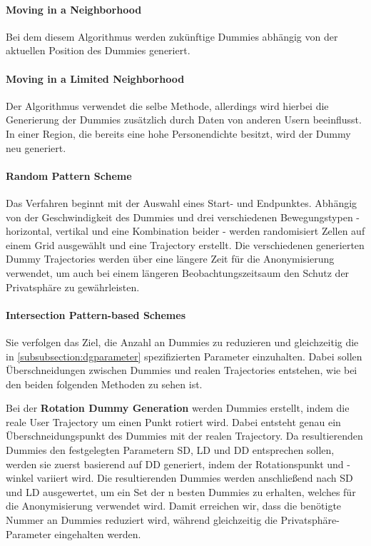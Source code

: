 	\paragraph{Moving in a Neighborhood \cite{Kido2005}} Bei dem diesem Algorithmus werden zukünftige Dummies abhängig von der aktuellen Position des Dummies generiert.
	\paragraph{Moving in a Limited Neighborhood} \cite{Kido2005} Der Algorithmus verwendet die selbe Methode, allerdings wird hierbei die Generierung der Dummies zusätzlich durch Daten von anderen Usern beeinflusst. In einer Region, die bereits eine hohe Personendichte besitzt, wird der Dummy neu generiert.
	\paragraph{Random Pattern Scheme \cite{You2007}} Das Verfahren beginnt mit der Auswahl eines Start- und Endpunktes. Abhängig von der Geschwindigkeit des Dummies und drei verschiedenen Bewegungstypen - horizontal, vertikal und eine Kombination beider - werden randomisiert Zellen auf einem Grid ausgewählt und eine Trajectory erstellt. Die verschiedenen generierten Dummy Trajectories werden über eine längere Zeit für die Anonymisierung verwendet, um auch bei einem längeren Beobachtungszeitsaum den Schutz der Privatsphäre zu gewährleisten.
	\paragraph{Intersection Pattern-based Schemes \cite{Lei2012}} Sie verfolgen das Ziel, die Anzahl an Dummies zu reduzieren und gleichzeitig die in \ref{subsubsection:dgparameter} spezifizierten Parameter einzuhalten. Dabei sollen Überschneidungen zwischen Dummies und realen Trajectories entstehen, wie bei den beiden folgenden Methoden zu sehen ist.
	
	Bei der \textbf{Rotation Dummy Generation} werden Dummies erstellt, indem die reale User Trajectory um einen Punkt rotiert wird. Dabei entsteht genau ein Überschneidungspunkt des Dummies mit der realen Trajectory. Da resultierenden Dummies den festgelegten Parametern SD, LD und DD entsprechen sollen, werden sie zuerst basierend auf DD generiert, indem der Rotationspunkt und -winkel variiert wird. Die resultierenden Dummies werden anschließend nach SD und LD ausgewertet, um ein Set der n besten Dummies zu erhalten, welches für die Anonymisierung verwendet wird. Damit erreichen wir, dass die benötigte Nummer an Dummies reduziert wird, während gleichzeitig die Privatsphäre-Parameter eingehalten werden.
	
